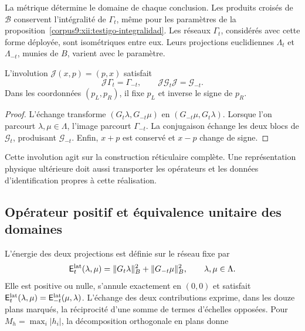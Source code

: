 La métrique détermine le domaine de chaque conclusion. Les produits
croisés de \(\mathcal B\) conservent l’intégralité de
\(\Gamma_t\), même pour les paramètres de la
proposition~\ref{corpus9:xii:testigo-integralidad}. Les réseaux
\(\Gamma_t\), considérés avec cette forme déployée, sont isométriques
entre eux. Leurs projections euclidiennes \(\Lambda_t\) et
\(\Lambda_{-t}\), munies de \(B\), varient avec le paramètre.

\begin{proposition}
\label{corpus9:xii:involucion-partida}
L'involution \(\mathcal J(x,p)=(p,x)\) satisfait
\[
 \mathcal J\Gamma_t=\Gamma_{-t},\qquad
 \mathcal J\mathcal G_t\mathcal J=\mathcal G_{-t}.
\]
Dans les coordonnées \((p_L,p_R)\), il fixe \(p_L\) et inverse
le signe de \(p_R\).

\end{proposition}
\begin{proof}
L’échange transforme \((G_t\lambda,G_{-t}\mu)\) en
\((G_{-t}\mu,G_t\lambda)\). Lorsque l’on parcourt \(\lambda,\mu\in\Lambda\),
l’image parcourt \(\Gamma_{-t}\). La conjugaison échange les
deux blocs de \(\mathcal G_t\), produisant \(\mathcal G_{-t}\).
Enfin, \(x+p\) est conservé et \(x-p\) change de signe.

\end{proof}

Cette involution agit sur la construction réticulaire complète. Une
représentation physique ultérieure doit aussi transporter les opérateurs
et les données d’identification propres à cette réalisation.

\subsection{Opérateur positif et équivalence unitaire des domaines
}
\label{corpus9:xii:energia-reticular}

L’énergie des deux projections est définie sur le réseau fixe par
\begin{equation}
 \mathsf E_t^{\rm lat}(\lambda,\mu)
 =\|G_t\lambda\|_B^2+\|G_{-t}\mu\|_B^2,
 \qquad \lambda,\mu\in\Lambda.
 \label{corpus9:xii:energia}
\end{equation}
Elle est positive ou nulle, s’annule exactement en \((0,0)\) et satisfait
\(\mathsf E_t^{\rm lat}(\lambda,\mu)
=\mathsf E_{-t}^{\rm lat}(\mu,\lambda)\). L’échange des deux
contributions exprime, dans les douze plans marqués, la réciprocité
d’une somme de termes d’échelles opposées. Pour
\(M_h=\max_i|h_i|\), la décomposition orthogonale en plans donne

